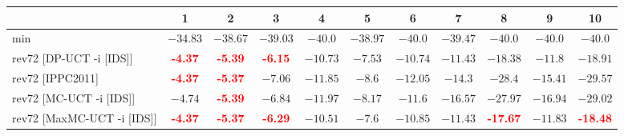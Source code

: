 \documentclass{article}
\begin{document}
\begin{tabular}{|l|r@{$\pm$}rr@{$\pm$}rr@{$\pm$}rr@{$\pm$}rr@{$\pm$}rr@{$\pm$}rr@{$\pm$}rr@{$\pm$}rr@{$\pm$}rr@{$\pm$}r|}
\hline

& \multicolumn{2}{c}{1}
& \multicolumn{2}{c}{2}
& \multicolumn{2}{c}{3}
& \multicolumn{2}{c}{4}
& \multicolumn{2}{c}{5}
& \multicolumn{2}{c}{6}
& \multicolumn{2}{c}{7}
& \multicolumn{2}{c}{8}
& \multicolumn{2}{c}{9}
& \multicolumn{2}{c|}{10}
\\
\hline
\hline
min
& \multicolumn{2}{c}{$-34.83$}
& \multicolumn{2}{c}{$-38.67$}
& \multicolumn{2}{c}{$-39.03$}
& \multicolumn{2}{c}{$-40.0$}
& \multicolumn{2}{c}{$-38.97$}
& \multicolumn{2}{c}{$-40.0$}
& \multicolumn{2}{c}{$-39.47$}
& \multicolumn{2}{c}{$-40.0$}
& \multicolumn{2}{c}{$-40.0$}
& \multicolumn{2}{c|}{$-40.0$}
\\
rev72 [DP-UCT -i [IDS]]
& \multicolumn{2}{c}{\textbf{\textcolor{red}{-4.37}}}
& \multicolumn{2}{c}{\textbf{\textcolor{red}{-5.39}}}
& \multicolumn{2}{c}{\textbf{\textcolor{red}{-6.15}}}
& \multicolumn{2}{c}{$-10.73$}
& \multicolumn{2}{c}{$-7.53$}
& \multicolumn{2}{c}{$-10.74$}
& \multicolumn{2}{c}{$-11.43$}
& \multicolumn{2}{c}{$-18.38$}
& \multicolumn{2}{c}{$-11.8$}
& \multicolumn{2}{c|}{$-18.91$}
\\
rev72 [IPPC2011]
& \multicolumn{2}{c}{\textbf{\textcolor{red}{-4.37}}}
& \multicolumn{2}{c}{\textbf{\textcolor{red}{-5.37}}}
& \multicolumn{2}{c}{$-7.06$}
& \multicolumn{2}{c}{$-11.85$}
& \multicolumn{2}{c}{$-8.6$}
& \multicolumn{2}{c}{$-12.05$}
& \multicolumn{2}{c}{$-14.3$}
& \multicolumn{2}{c}{$-28.4$}
& \multicolumn{2}{c}{$-15.41$}
& \multicolumn{2}{c|}{$-29.57$}
\\
rev72 [MC-UCT -i [IDS]]
& \multicolumn{2}{c}{$-4.74$}
& \multicolumn{2}{c}{\textbf{\textcolor{red}{-5.39}}}
& \multicolumn{2}{c}{$-6.84$}
& \multicolumn{2}{c}{$-11.97$}
& \multicolumn{2}{c}{$-8.17$}
& \multicolumn{2}{c}{$-11.6$}
& \multicolumn{2}{c}{$-16.57$}
& \multicolumn{2}{c}{$-27.97$}
& \multicolumn{2}{c}{$-16.94$}
& \multicolumn{2}{c|}{$-29.02$}
\\
rev72 [MaxMC-UCT -i [IDS]]
& \multicolumn{2}{c}{\textbf{\textcolor{red}{-4.37}}}
& \multicolumn{2}{c}{\textbf{\textcolor{red}{-5.37}}}
& \multicolumn{2}{c}{\textbf{\textcolor{red}{-6.29}}}
& \multicolumn{2}{c}{$-10.51$}
& \multicolumn{2}{c}{$-7.6$}
& \multicolumn{2}{c}{$-10.85$}
& \multicolumn{2}{c}{$-11.43$}
& \multicolumn{2}{c}{\textbf{\textcolor{red}{-17.67}}}
& \multicolumn{2}{c}{$-11.83$}
& \multicolumn{2}{c|}{\textbf{\textcolor{red}{-18.48}}}
\\

\end{tabular}
\end{document}
